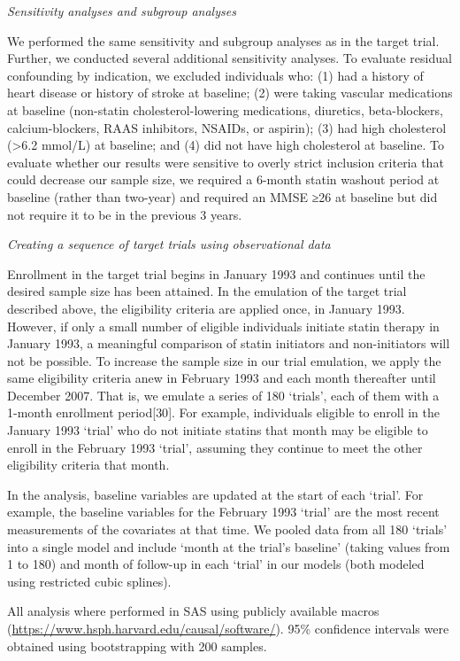 \documentclass[
]{book}
\begin{document}
\emph{Sensitivity analyses and subgroup analyses}

We performed the same sensitivity and subgroup analyses as in the target trial. Further, we conducted several additional sensitivity analyses. To evaluate residual confounding by indication, we excluded individuals who: (1) had a history of heart disease or history of stroke at baseline; (2) were taking vascular medications at baseline (non-statin cholesterol-lowering medications, diuretics, beta-blockers, calcium-blockers, RAAS inhibitors, NSAIDs, or aspirin); (3) had high cholesterol (\textgreater6.2 mmol/L) at baseline; and (4) did not have high cholesterol at baseline. To evaluate whether our results were sensitive to overly strict inclusion criteria that could decrease our sample size, we required a 6-month statin washout period at baseline (rather than two-year) and required an MMSE ≥26 at baseline but did not require it to be in the previous 3 years.

\emph{Creating a sequence of target trials using observational data}

Enrollment in the target trial begins in January 1993 and continues until the desired sample size has been attained. In the emulation of the target trial described above, the eligibility criteria are applied once, in January 1993. However, if only a small number of eligible individuals initiate statin therapy in January 1993, a meaningful comparison of statin initiators and non-initiators will not be possible. To increase the sample size in our trial emulation, we apply the same eligibility criteria anew in February 1993 and each month thereafter until December 2007. That is, we emulate a series of 180 `trials', each of them with a 1-month enrollment period{[}30{]}. For example, individuals eligible to enroll in the January 1993 `trial' who do not initiate statins that month may be eligible to enroll in the February 1993 `trial', assuming they continue to meet the other eligibility criteria that month.

In the analysis, baseline variables are updated at the start of each `trial'. For example, the baseline variables for the February 1993 `trial' are the most recent measurements of the covariates at that time. We pooled data from all 180 `trials' into a single model and include `month at the trial's baseline' (taking values from 1 to 180) and month of follow-up in each `trial' in our models (both modeled using restricted cubic splines).

All analysis where performed in SAS using publicly available macros (\url{https://www.hsph.harvard.edu/causal/software/}). 95\% confidence intervals were obtained using bootstrapping with 200 samples.
\end{document}
